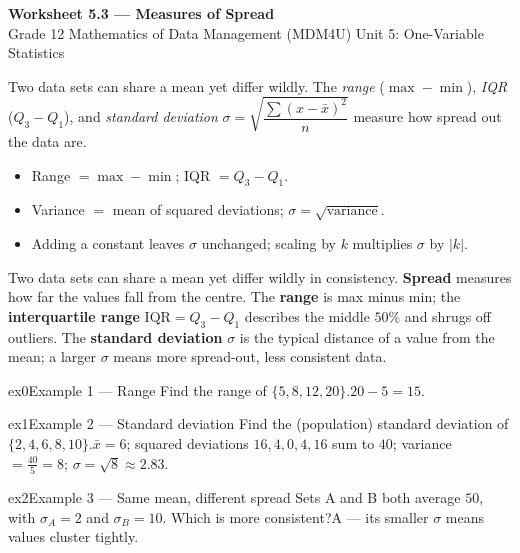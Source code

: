 \documentclass[11pt]{article}
\begin{document}
\begin{center}
{\LARGE\bfseries\color{titleblue}Worksheet 5.3 --- Measures of Spread}\\[2pt]
{\small Grade 12 Mathematics of Data Management (MDM4U) \textperiodcentered{} Unit 5: One-Variable Statistics}
\end{center}

\begin{ideabox}
Two data sets can share a mean yet differ wildly. The \emph{range} ($\max-\min$), \emph{IQR} ($Q_3-Q_1$), and \emph{standard deviation} $\sigma=\sqrt{\dfrac{\sum(x-\bar x)^2}{n}}$ measure how spread out the data are.
\begin{itemize}[leftmargin=*,itemsep=2pt]
  \item Range $=\max-\min$; IQR $=Q_3-Q_1$.
  \item Variance $=$ mean of squared deviations; $\sigma=\sqrt{\text{variance}}$.
  \item Adding a constant leaves $\sigma$ unchanged; scaling by $k$ multiplies $\sigma$ by $|k|$.
\end{itemize}
\end{ideabox}

\begin{learnbox}
Two data sets can share a mean yet differ wildly in consistency. \textbf{Spread} measures how far the values fall from the centre.
The \textbf{range} is max minus min; the \textbf{interquartile range} $\mathrm{IQR}=Q_3-Q_1$ describes the middle $50\%$ and shrugs off outliers.
The \textbf{standard deviation} $\sigma$ is the typical distance of a value from the mean; a larger $\sigma$ means more spread-out, less consistent data.
\end{learnbox}


\begin{example}{ex0}{Example 1 --- Range}
Find the range of $\{5,8,12,20\}$.\soln $20-5=15$.
\end{example}

\begin{example}{ex1}{Example 2 --- Standard deviation}
Find the (population) standard deviation of $\{2,4,6,8,10\}$.\soln $\bar x=6$; squared deviations $16,4,0,4,16$ sum to $40$; variance $=\tfrac{40}{5}=8$; $\sigma=\sqrt{8}\approx2.83$.
\end{example}

\begin{example}{ex2}{Example 3 --- Same mean, different spread}
Sets A and B both average $50$, with $\sigma_A=2$ and $\sigma_B=10$. Which is more consistent?\soln A --- its smaller $\sigma$ means values cluster tightly.
\end{example}
\end{document}
